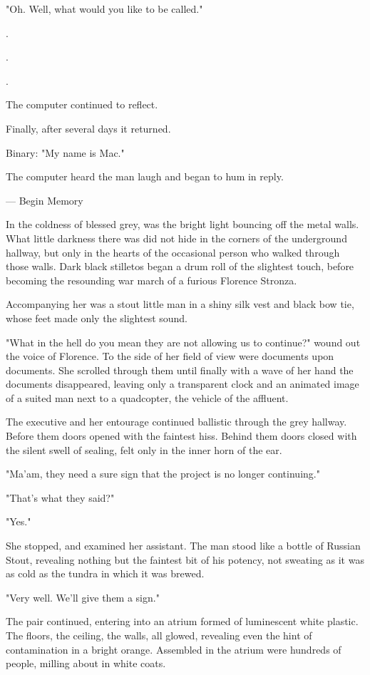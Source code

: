 \documentclass[12pt]{article}
\begin{document}
"Oh. Well, what would you like to be called."

.

.

.

The computer continued to reflect.

Finally, after several days it returned.

Binary: "My name is Mac."

The computer heard the man laugh and began to hum in reply.

--- Begin Memory

In the coldness of blessed grey, was the bright light bouncing off the metal walls. What little darkness there was did not hide in the corners of the underground hallway, but only in the hearts of the occasional person who walked through those walls. Dark black stilletos began a drum roll of the slightest touch, before becoming the resounding war march of a furious Florence Stronza.

Accompanying her was a stout little man in a shiny silk vest and black bow tie, whose feet made only the slightest sound.

"What in the hell do you mean they are not allowing us to continue?" wound out the voice of Florence. To the side of her field of view were documents upon documents. She scrolled through them until finally with a wave of her hand the documents disappeared, leaving only a transparent clock and an animated image of a suited man next to a quadcopter, the vehicle of the affluent.

The executive and her entourage continued ballistic through the grey hallway. Before them doors opened with the faintest hiss. Behind them doors closed with the silent swell of sealing, felt only in the inner horn of the ear.

"Ma'am, they need a sure sign that the project is no longer continuing."

"That's what they said?"

"Yes."

She stopped, and examined her assistant. The man stood like a bottle of Russian Stout, revealing nothing but the faintest bit of his potency, not sweating as it was as cold as the tundra in which it was brewed.

"Very well. We'll give them a sign."

The pair continued, entering into an atrium formed of luminescent white plastic. The floors, the ceiling, the walls, all glowed, revealing even the hint of contamination in a bright orange. Assembled in the atrium were hundreds of people, milling about in white coats. 
\end{document}
